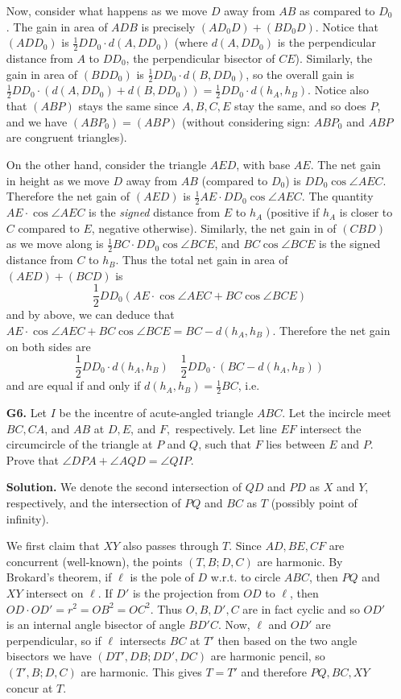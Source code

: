 \documentclass[11pt,a4paper]{article}
\begin{document}
\begin{enumerate}
	Now, consider what happens as we move $D$ away from $AB$ as compared to $D_0$. The gain in area of $ADB$ is precisely $(AD_0D)+(BD_0D)$. Notice that $(ADD_0)$ is $\frac 12 DD_0\cdot d(A, DD_0)$ (where $d(A, DD_0)$ is the perpendicular distance from $A$ to $DD_0$, the perpendicular bisector of $CE$). 
	Similarly, the gain in area of $(BDD_0)$ is $\frac 12 DD_0\cdot d(B, DD_0)$, so the overall gain is $\frac 12 DD_0\cdot (d(A, DD_0)+d(B, DD_0))=\frac 12 DD_0\cdot d(h_A, h_B)$. 
	Notice also that $(ABP)$ stays the same since $A, B, C, E$ stay the same, and so does $P$, and we have $(ABP_0)=(ABP)$ (without considering sign: $ABP_0$ and $ABP$ are congruent triangles). 
	
	On the other hand, consider the triangle $AED$, with base $AE$. The net gain in height as we move $D$ away from $AB$ (compared to $D_0$) is $ DD_0\cos\angle AEC$. Therefore the net gain of $(AED)$ is $\frac 12 AE\cdot DD_0\cos\angle AEC$. The quantity $AE\cdot \cos \angle AEC$ is the \emph{signed} distance from $E$ to $h_A$ (positive if $h_A$ is closer to $C$ compared to $E$, negative otherwise). Similarly, the net gain in of $(CBD)$ as we move along is $\frac 12BC\cdot DD_0\cos\angle BCE$, and $BC\cos\angle BCE$ is the signed distance from $C$ to $h_B$. 
	Thus the total net gain in area of $(AED)+(BCD)$ is 
	\[
	\frac 12 DD_0(AE\cdot \cos \angle AEC+BC\cos\angle BCE)
	\]
	and by above, we can deduce that $AE\cdot \cos \angle AEC+BC\cos\angle BCE=BC - d(h_A, h_B)$. Therefore the net gain on both sides are 
	\[
	\frac 12 DD_0\cdot d(h_A, h_B)\quad \frac 12 DD_0\cdot (BC-d(h_A, h_B))
	\]
	and are equal if and only if $d(h_A, h_B)=\frac 12 BC$, i.e. 
	
	
	\item [\textbf{G6.}] Let $I$ be the incentre of acute-angled triangle $ABC$. Let the incircle meet $BC, CA$, and $AB$ at $D, E$, and $F,$ respectively. Let line $EF$ intersect the circumcircle of the triangle at $P$ and $Q$, such that $F$ lies between $E$ and $P$. Prove that $\angle DPA + \angle AQD =\angle QIP$.
	
	\textbf{Solution.} We denote the second intersection of $QD$ and $PD$ as $X$ and $Y$, respectively, and the intersection of $PQ$ and $BC$ as $T$ (possibly point of infinity).
	
	We first claim that $XY$ also passes through $T$. Since $AD, BE, CF$ are concurrent (well-known), the points $(T, B; D, C)$ are harmonic. By Brokard's theorem, if $\ell$ is the pole of $D$ w.r.t. to circle $ABC$, then $PQ$ and $XY$ intersect on $\ell$. If $D'$ is the projection from $OD$ to $\ell$, then $OD\cdot OD' = r^2 = OB^2=OC^2$. Thus $O, B, D', C$ are in fact cyclic and so $OD'$ is an internal angle bisector of angle $BD'C$. Now, $\ell$ and $OD'$ are perpendicular, so if $\ell$ intersects $BC$ at $T'$ then based on the two angle bisectors we have $(DT', DB; DD', DC)$ are harmonic pencil, so $(T', B; D, C)$ are harmonic. This gives $T=T'$ and therefore $PQ, BC, XY$ concur at $T$.
	

\end{enumerate}
\end{document}
